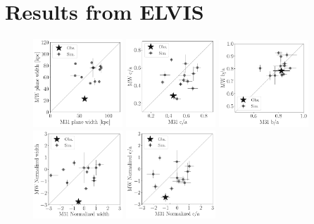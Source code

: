 \documentclass[a4paper,fleqn,usenatbib]{mnras}
\begin{document}
\section{Results from ELVIS}
\begin{figure}
\centering
\includegraphics[width=0.30\textwidth]{scatter_ranked_elvis_width.pdf}
\includegraphics[width=0.30\textwidth]{scatter_ranked_elvis_ca_ratio.pdf}
\includegraphics[width=0.30\textwidth]{scatter_ranked_elvis_ba_ratio.pdf}
\includegraphics[width=0.30\textwidth]{scatter_norm_ranked_elvis_width.pdf}
\includegraphics[width=0.30\textwidth]{scatter_norm_ranked_elvis_ca_ratio.pdf}

\end{figure}
\end{document}
